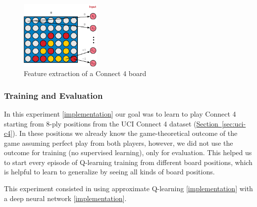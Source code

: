 \documentclass{article}
\newcommand{\GithubURL}[1]{[\href{https://github.com/davidrobles/mlnd-capstone-code/blob/master/#1}{implementation}]}
\begin{document}


\begin{figure}[!h]
    \centering
    \includegraphics[width=0.35\textwidth]{figures/c4-dnn-input.pdf}
    \caption{Feature extraction of a Connect 4 board}
    \label{fig:c4-dnn-input}
\end{figure}

\subsubsection{Training and Evaluation}

In this experiment \GithubURL{experiments/c4_dvn_uci.py} our goal was to learn to play Connect 4
starting from 8-ply positions from the UCI Connect 4 dataset (\hyperref[sec:uci-c4]
{Section~\ref*{sec:uci-c4}}). In these positions we already know the game-theoretical outcome of the
game assuming perfect play from both players, however, we did not use the outcome for training (no
supervised learning), only for evaluation. This helped us to start every episode of Q-learning
training from different board positions, which is helpful to learn to generalize by seeing all kinds
of board positions.

This experiment consisted in using approximate Q-learning
\GithubURL{capstone/rl/learners/qlearning_approx.py} with a deep neural network
\GithubURL{capstone/rl/value_functions/c4deepnetwork.py}.




\end{document}

